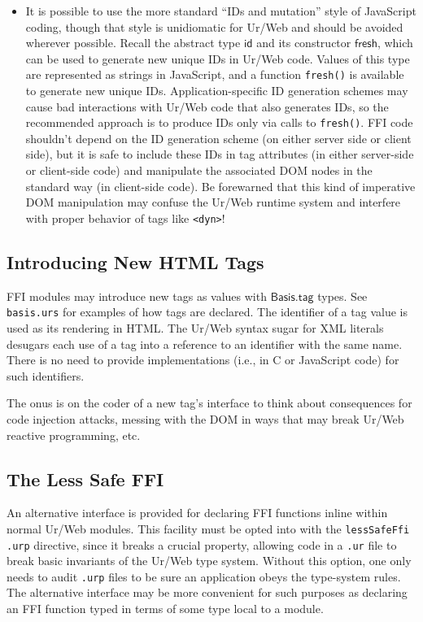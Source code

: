 \documentclass{article}
\newcommand{\cd}[1]{\texttt{#1}}
\newcommand{\mt}[1]{\mathsf{#1}}
\begin{document}
\begin{itemize}
\item It is possible to use the more standard ``IDs and mutation'' style of JavaScript coding, though that style is unidiomatic for Ur/Web and should be avoided wherever possible.  Recall the abstract type $\mt{id}$ and its constructor $\mt{fresh}$, which can be used to generate new unique IDs in Ur/Web code.  Values of this type are represented as strings in JavaScript, and a function \cd{fresh()} is available to generate new unique IDs.  Application-specific ID generation schemes may cause bad interactions with Ur/Web code that also generates IDs, so the recommended approach is to produce IDs only via calls to \cd{fresh()}.  FFI code shouldn't depend on the ID generation scheme (on either server side or client side), but it is safe to include these IDs in tag attributes (in either server-side or client-side code) and manipulate the associated DOM nodes in the standard way (in client-side code).  Be forewarned that this kind of imperative DOM manipulation may confuse the Ur/Web runtime system and interfere with proper behavior of tags like \cd{<dyn>}!
\end{itemize}

\subsection{Introducing New HTML Tags}

FFI modules may introduce new tags as values with $\mt{Basis.tag}$ types.  See \texttt{basis.urs} for examples of how tags are declared.  The identifier of a tag value is used as its rendering in HTML.  The Ur/Web syntax sugar for XML literals desugars each use of a tag into a reference to an identifier with the same name.  There is no need to provide implementations (i.e., in C or JavaScript code) for such identifiers.

The onus is on the coder of a new tag's interface to think about consequences for code injection attacks, messing with the DOM in ways that may break Ur/Web reactive programming, etc.

\subsection{The Less Safe FFI}

An alternative interface is provided for declaring FFI functions inline within normal Ur/Web modules.  This facility must be opted into with the \texttt{lessSafeFfi} \texttt{.urp} directive, since it breaks a crucial property, allowing code in a \texttt{.ur} file to break basic invariants of the Ur/Web type system.  Without this option, one only needs to audit \texttt{.urp} files to be sure an application obeys the type-system rules.  The alternative interface may be more convenient for such purposes as declaring an FFI function typed in terms of some type local to a module.
\end{document}
